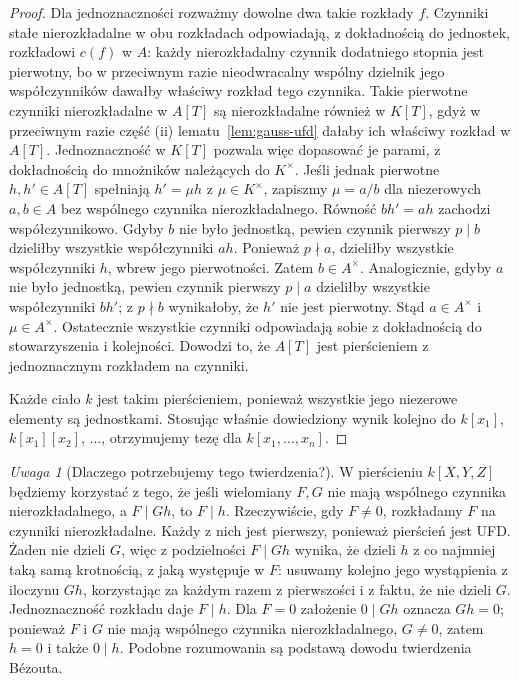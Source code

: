 \documentclass[11pt,a4paper,openany]{report}
\numberwithin{equation}{section}
\theoremstyle{plain}
\theoremstyle{definition}
\theoremstyle{remark}
\newtheorem{uwaga}[twierdzenie]{Uwaga}
\begin{document}
\begin{proof}
Dla jednoznaczności rozważmy dowolne dwa takie rozkłady $f$.
Czynniki stałe nierozkładalne w obu rozkładach
odpowiadają, z dokładnością do jednostek, rozkładowi
$c(f)$ w $A$: każdy nierozkładalny czynnik dodatniego
stopnia jest pierwotny, bo w przeciwnym razie
nieodwracalny wspólny dzielnik jego współczynników
dawałby właściwy rozkład tego czynnika.
Takie pierwotne czynniki nierozkładalne w $A[T]$
są nierozkładalne również w $K[T]$, gdyż w przeciwnym
razie część (ii) lematu~\ref{lem:gauss-ufd} dałaby
ich właściwy rozkład w $A[T]$.
Jednoznaczność w $K[T]$ pozwala więc dopasować je parami,
z dokładnością do mnożników należących do $K^\times$.
Jeśli jednak pierwotne $h,h'\in A[T]$ spełniają
$h'=\mu h$ z $\mu\in K^\times$, zapiszmy $\mu=a/b$
dla niezerowych $a,b\in A$ bez wspólnego czynnika
nierozkładalnego. Równość $bh'=ah$ zachodzi
współczynnikowo. Gdyby $b$ nie było jednostką,
pewien czynnik pierwszy $p\mid b$ dzieliłby wszystkie
współczynniki $ah$. Ponieważ $p\nmid a$, dzieliłby
wszystkie współczynniki $h$, wbrew jego pierwotności.
Zatem $b\in A^\times$. Analogicznie, gdyby $a$ nie
było jednostką, pewien czynnik pierwszy $p\mid a$
dzieliłby wszystkie współczynniki $bh'$; z $p\nmid b$
wynikałoby, że $h'$ nie jest pierwotny. Stąd
$a\in A^\times$ i $\mu\in A^\times$.
Ostatecznie wszystkie czynniki odpowiadają sobie
z dokładnością do stowarzyszenia i kolejności.
Dowodzi to, że $A[T]$ jest pierścieniem
z jednoznacznym rozkładem na czynniki.

Każde ciało $k$ jest takim pierścieniem, ponieważ
wszystkie jego niezerowe elementy są jednostkami.
Stosując właśnie dowiedziony wynik kolejno do
$k[x_1]$, $k[x_1][x_2]$, $\dots$,
otrzymujemy tezę dla $k[x_1,\dots,x_n]$.
\end{proof}

\begin{uwaga}[Dlaczego potrzebujemy tego twierdzenia?]
W pierścieniu $k[X,Y,Z]$ będziemy korzystać z tego,
że jeśli wielomiany $F,G$ nie mają wspólnego czynnika
nierozkładalnego, a $F\mid Gh$, to $F\mid h$.
Rzeczywiście, gdy $F\ne0$, rozkładamy $F$ na czynniki
nierozkładalne. Każdy z nich jest pierwszy, ponieważ
pierścień jest UFD. Żaden nie dzieli $G$, więc z podzielności
$F\mid Gh$ wynika, że dzieli $h$ z co najmniej taką samą
krotnością, z jaką występuje w $F$: usuwamy kolejno jego
wystąpienia z iloczynu $Gh$, korzystając za każdym razem
z pierwszości i z faktu, że nie dzieli $G$.
Jednoznaczność rozkładu daje $F\mid h$.
Dla $F=0$ założenie $0\mid Gh$ oznacza $Gh=0$;
ponieważ $F$ i $G$ nie mają wspólnego czynnika
nierozkładalnego, $G\ne0$, zatem $h=0$ i także $0\mid h$.
Podobne rozumowania są podstawą dowodu twierdzenia Bézouta.
\end{uwaga}
\end{document}
